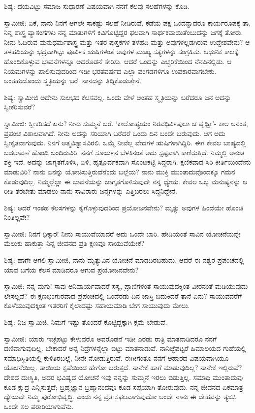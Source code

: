 ಶಿಷ್ಯ: ದಯವಿಟ್ಟು ಸಮಾಜ ಸುಧಾರಣೆ ವಿಷಯವಾಗಿ ನನಗೆ ಕೆಲವು ಸಲಹೆಗಳನ್ನು ಕೊಡಿ.

ಸ್ವಾಮೀಜಿ: ಏಕೆ, ನಾನು ನಿನಗೆ ಆಗಲೇ ಸಾಕಷ್ಟು ಸಲಹೆ ನೀಡಿರುವೆ. ಕಡೆಯ ಪಕ್ಷ ಒಂದನ್ನಾದರೂ ಕಾರ್ಯರೂಪಕ್ಕೆ ತಾ, ನಿನ್ನ ಶಾಸ್ತ್ರ ವ್ಯಾಸಂಗಗಳು ನನ್ನ ಮಾತುಗಳಿಗೆ ಕಿವಿಗೊಟ್ಟಿದ್ದರ ಫಲವಾಗಿ ಸಾರ್ಥಕವಾಯಿತೆಂಬುದನ್ನು ಜಗಕ್ಕೆ ತೋರು. ನೀನು ಓದಿರುವ ಮನುಧರ್ಮಶಾಸ್ತ್ರ ಮತ್ತು ಇತರ ಪುಸ್ತಕಗಳ ತಳಹದಿ ಮತ್ತು ಅವುಗಳಲ್ಲಡಗಿರುವ ಉದ್ದೇಶವೇನು? ಆ ತಳಹದಿಯನ್ನು ಭದ್ರವಾಗಿಟ್ಟು ಪೂರ್ವಿಕ ಋಷಿಗಳಂತೆ ಅವುಗಳ ಮುಖ್ಯ ಸತ್ಯಗಳನ್ನು ಸಂಗ್ರಹಿಸು. ಆಧುನಿಕ ಕಾಲಕ್ಕೆ ಹೊಂದಿಕೊಳ್ಳುವ ಭಾವನೆಗಳನ್ನೂ ಅದರೊಡನೆ ಸೇರಿಸು. ಆದರೆ ಒಂದನ್ನು ಎಚ್ಚರಿಕೆಯಿಂದ ನೆನಪಿನಲ್ಲಿಡು. ಆ ನಿಯಮಗಳನ್ನು ಪಾಲಿಸುವುದರಿಂದ ಇಡೀ ಭರತವರ್ಷದ ಎಲ್ಲಾ ಪಂಗಡಗಳಿಗೂ ಉಪಕಾರವಾಗಬೇಕು. ಅಂತಹುದೊಂದು ಸ್ಮೃತಿಯನ್ನು ಬರೆ. ನಾನದನ್ನು ತಿದ್ದಿಕೊಡುತ್ತೇನೆ.

ಶಿಷ್ಯ: ಸ್ವಾಮೀಜಿ ಅದೇನು ಸುಲಭದ ಕೆಲಸವಲ್ಲ. ಒಂದು ವೇಳೆ ಅಂತಹ ಸ್ಮೃತಿಯನ್ನು ಬರೆದರೂ ಜನ ಅದನ್ನು ಸ್ವೀಕರಿಸುವರೆ?

ಸ್ವಾಮೀಜಿ: ಸ್ವೀಕರಿಸದೆ ಏನು? ನೀನು ಸುಮ್ಮನೆ ಬರೆ. ‘ಕಾಲೋಹ್ಯಯಂ ನಿರವಧಿರ್ವಿಪುಲಾ ಚ ಪೃಥ್ವೀ’- ಕಾಲ ಅನಂತ, ಪ್ರಪಂಚ ವಿಶಾಲವಾಗಿದೆ. ನೀನು ಅದನ್ನು ಸರಿಯಾಗಿ ಬರೆದರೆ ಒಂದು ದಿನ ಬಂದೇ ಬರುವುದು. ಆಗ ಅದು ಸ್ವೀಕೃತವಾಗುವುದು. ನಿನಗೆ ಆತ್ಮವಿಶ್ವಾಸವಿರಲಿ. ಒಮ್ಮೆ ನೀವೆಲ್ಲ ವೇದಗಳ ಋಷಿಗಳಾಗಿದ್ದಿರಿ. ಈಗ ಕೇವಲ ಬಾಹ್ಯದಲ್ಲಿ ಬದಲಾವಣೆ ಹೊಂದಿ ಬಂದಿರುವಿರಿ. ನನಗೆ ಸೂರ್ಯನ ಬೆಳಕಿನಂತೆ ಅದು ಸ್ಪಷ್ಟವಾಗಿ ಕಾಣಿಸುತ್ತಿದೆ. ನಿಮ್ಮಲ್ಲಿ ಅನಂತ ಶಕ್ತಿ ಇದೆ. ಅದನ್ನು ಜಾಗೃತಗೊಳಿಸಿ, ಏಳಿ, ಹೃತ್ಪೂರ್ವಕವಾಗಿ ಸೊಂಟಕಟ್ಟಿ ಸಿದ್ಧರಾಗಿ. ಕ್ಷಣಿಕವಾದ ಸಿರಿ ಕೀರ್ತಿಯಿಂದೇನು ಮಾಡುವಿರಿ? ನಾನು ಏನನ್ನು ಯೋಚಿಸುತ್ತಿರುವೆನೆಂದು ಬಲ್ಲೆಯ? ನಾನು ಮುಕ್ತಿ ಮುಂತಾದುವೊಂದಕ್ಕೂ ಗಮನ ಕೊಡುವುದಿಲ್ಲ. ನಿಮ್ಮಲ್ಲೆಲ್ಲಾ ಈ ಭಾವನೆಯನ್ನು ಜಾಗೃತಗೊಳಿಸುವುದೇ ನನ್ನ ಧ್ಯೇಯ. ಕೇವಲ ಒಬ್ಬ ಮನುಷ್ಯನನ್ನು ಆ ರೀತಿ ತರಬೇತು ಮಾಡಲು ನಾನು ಸಾವಿರಾರು ಜನ್ಮಗಳನ್ನು ಎತ್ತಿಬರಲು ಸಿದ್ಧನಿದ್ದೇನೆ.

ಶಿಷ್ಯ: ಆದರೆ ಇಂತಹ ಕೆಲಸಗಳನ್ನು ಕೈಗೊಳ್ಳುವುದರಿಂದ ಪ್ರಯೋಜನವೇನು? ಮೃತ್ಯು ಅವುಗಳ ಹಿಂದೆಯೇ ಹೊಂಚಿ ನಿಂತಿಲ್ಲವೇ?

ಸ್ವಾಮೀಜಿ: ನಿನಗೆ ಧಿಕ್ಕಾರ! ನೀನು ಸಾಯುವೆಯಾದರೆ ಅದು ಒಂದೇ ಬಾರಿ. ಹೇಡಿಯಂತೆ ಸಾವಿನ ಯೋಚನೆಯನ್ನೇ ಮೆಲುಕು ಹಾಕುತ್ತಾ ನಿನ್ನ ಜೀವನದ ಪ್ರತಿ ಕ್ಷಣವೂ ಸಾಯುವೆಯೇಕೆ?

ಶಿಷ್ಯ: ಹಾಗೇ ಆಗಲಿ ಸ್ವಾಮೀಜಿ, ನಾನು ಮೃತ್ಯುವಿನ ಯೋಚನೆ ಮಾಡದಿರಬಹುದು. ಆದರೆ ಈ ನಶ್ವರ ಪ್ರಪಂಚದಲ್ಲಿ ಯಾವ ಬಗೆಯ ಕೆಲಸ ಮಾಡಿದರೂ ಆಗುವ ಪ್ರಯೋಜನವೇನು?

ಸ್ವಾಮಿಜಿ: ನನ್ನ ಮಗು! ಸಾವು ಅನಿವಾರ್ಯವಾದರೆ ಸಸ್ಯ, ಪ್ರಾಣಿಗಳಂತೆ ಸಾಯುವುದಕ್ಕಿಂತ ವೀರನಂತೆ ಮಡಿಯುವುದು ಲೇಸಲ್ಲವೆ? ಈ ಕ್ಷಣಭಂಗುರವಾದ ಪ್ರಪಂಚದಲ್ಲಿ ಒಂದೆರಡು ದಿನ ಜಾಸ್ತಿ ಬದುಕಿದರೆ ತಾನೆ ಏನು? ಸಾಯುವವರೆಗೆ ಕೊಳೆಯುವುದಕ್ಕಿಂತ ಇತರರಿಗೆ ಕೈಲಾದಷ್ಟು ಸಹಾಯಮಾಡಿ ಬೇಗ ಸಾಯುವುದು ಮೇಲು.

ಶಿಷ್ಯ: ನಿಜ ಸ್ವಾಮಿಜಿ, ನಿಮಗೆ ಇಷ್ಟು ತೊಂದರೆ ಕೊಟ್ಟಿದ್ದಕ್ಕಾಗಿ ಕ್ಷಮೆ ಬೇಡುವೆ.

ಸ್ವಾಮೀಜಿ: ಯಾರು ಇಚ್ಛೆಪಟ್ಟು ಕೇಳುವರೊ ಅವರೊಡನೆ ಇಡೀ ಎರಡು ರಾತ್ರಿ ಮಾತನಾಡಿದರೂ ನನಗೆ ದಣಿವಾಗುವುದಿಲ್ಲ. ಬೇಕಾದರೆ ಅನ್ನ ನಿದ್ರೆಗಳನ್ನೆಲ್ಲಾ ಬಿಟ್ಟು ಮಾತನಾಡುವೆ. ನಾನಿಚ್ಛೆಪಟ್ಟರೆ ಹಿಮಾಲಯದ ಗುಹೆಯಲ್ಲಿ ಸಮಾಧಿಸ್ಥಿತಿಯಲ್ಲಿ ಕುಳಿತಿರಬಲ್ಲೆ, ನೀನೇ ನೋಡುತ್ತಿರುವೆ. ಈಗೀಗಂತೂ ನನಗೆ ಆಹಾರದ ವಿಷಯವಾಗಿಯೂ ಯೊಚನೆಯಿಲ್ಲ. ತಾಯಿಯ ಕೃಪೆಯಿಂದ ಹೇಗೋ ಬರುತ್ತದೆ. ನಾನೇಕೆ ಹಾಗೆ ಮಾಡುವುದಿಲ್ಲ? ನಾನೇಕೆ ಇಲ್ಲಿರುವೆ? ದೇಶದ ದುಃಸ್ಥಿತಿ, ಅದರ ಭವಿಷ್ಯದ ಯೋಚನೆ ಇವು ನನ್ನನ್ನು ಸುಮ್ಮನೆ ಇರಲು ಬಿಡುತ್ತಿಲ್ಲ. ಸಮಾಧಿ ಮುಂತಾದುವು ಕೂಡ ಕ್ಷುದ್ರ ಎನ್ನಿಸುತ್ತದೆ; ಬ್ರಹ್ಮಜ್ಞಾನ ಬ್ರಹ್ಮಾನಂದವೂ ಕೂಡ ಸಪ್ಪೆಯಾಗಿ ತೋರುವುದು. ನನ್ನ ಜೀವನದ ಏಕಮಾತ್ರ ಧ್ಯೇಯವೇ ನಿಮ್ಮ ಪುರೋಭಿವೃದ್ಧಿ. ಎಂದು ನನ್ನ ವ್ರತ ಸಫಲವಾಗುವುದೋ ಅಂದೇ ನಾನು ಈ ದೇಹವನ್ನು ತ್ಯಜಿಸಿ ಒಂದೇ ಸಲ ಪರಾರಿಯಾಗುವೆನು.

